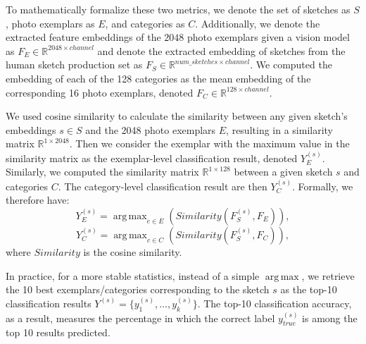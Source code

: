 \documentclass[10pt,letterpaper]{article}
\DeclareMathOperator*{\argmax}{arg\,max} %
\begin{document}
\noindent To mathematically formalize these two metrics, we denote the set of sketches as $S$, photo exemplars as $E$, and categories as $C$. 
Additionally, we denote the extracted feature embeddings of the $2048$ photo exemplars given a vision model as $F_{E} \in \mathbb{R}^{2048\times channel}$ and denote the extracted embedding of sketches from the human sketch production set as $F_{S} \in \mathbb{R}^{num\_sketches\times channel}$.
We computed the embedding of each of the 128 categories as the mean embedding of the corresponding 16 photo exemplars, denoted $F_{C} \in \mathbb{R}^{128 \times channel}$.

We used cosine similarity to calculate the similarity between any given sketch's embeddings $s\in S$ and the 2048 photo exemplars $E$, resulting in a similarity matrix $\mathbb{R}^{1 \times 2048}$. Then we consider the exemplar with the maximum value in the similarity matrix as the exemplar-level classification result, denoted $Y_{E}^{(s)}$.
Similarly, we computed the similarity matrix $\mathbb{R}^{1 \times 128}$ between a given sketch $s$ and categories $C$. The category-level classification result are then $Y_{C}^{(s)}$.
Formally, we therefore have:
\begin{equation}\label{eq:p exemplar}
    Y_{E}^{(s)} = \argmax_{e\in E} (Similarity(F_{S}^{(s)}, F_{E})),
\end{equation}
\vspace{-0.5em}
\begin{equation}\label{eq:p category}
    Y_{C}^{(s)} = \argmax_{c\in C} (Similarity(F_{S}^{(s)}, F_{C})),
\end{equation}
where $Similarity$ is the cosine similarity.

In practice, for a more stable statistics, instead of a simple $\argmax$, we retrieve the 10 best exemplars/categories corresponding to the sketch $s$ as the top-10 classification results $Y^{(s)} = \{y_1^{(s)}, ..., y_k^{(s)}\}$. The top-10 classification accuracy, as a result, measures the percentage in which the correct label $y_{true}^{(s)}$ is among the top 10 results predicted.
\end{document}
